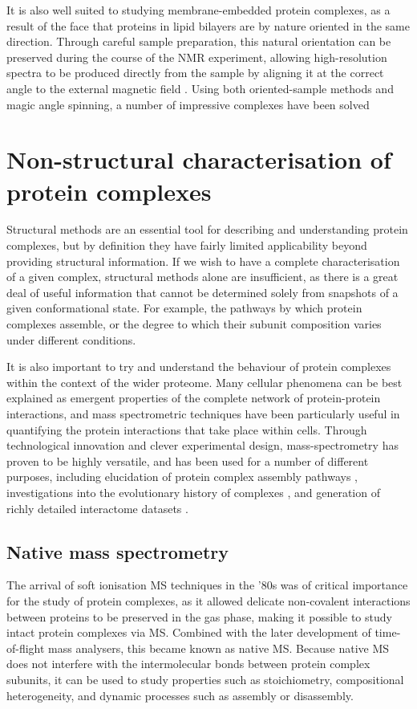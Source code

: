 \documentclass[a4paper,11pt,twoside,openright]{scrbook}
\begin{document}
It is also well suited to studying membrane-embedded protein complexes, as a result of the face that proteins in lipid bilayers are by nature oriented in the same direction. Through careful sample preparation, this natural orientation can be preserved during the course of the NMR experiment, allowing high-resolution spectra to be produced directly from the sample by aligning it at the correct angle to the external magnetic field \cite{Hansen2015}. Using both oriented-sample methods and magic angle spinning, a number of impressive complexes have been solved \cite{Loquet2012,Kaplan2015,Huang2017}

\section{Non-structural characterisation of protein complexes}
Structural methods are an essential tool for describing and understanding protein complexes, but by definition they have fairly limited applicability beyond providing structural information. If we wish to have a complete characterisation of a given complex, structural methods alone are insufficient, as there is a great deal of useful information that cannot be determined solely from snapshots of a given conformational state. For example, the pathways by which protein complexes assemble, or the degree to which their subunit composition varies under different conditions.

It is also important to try and understand the behaviour of protein complexes within the context of the wider proteome. Many cellular phenomena can be best explained as emergent properties of the complete network of protein-protein interactions, and mass spectrometric techniques have been particularly useful in quantifying the protein interactions that take place within cells. Through technological innovation and clever experimental design, mass-spectrometry has proven to be highly versatile, and has been used for a number of different purposes, including elucidation of protein complex assembly pathways \cite{Levy2008,Marsh2013}, investigations into the evolutionary history of complexes \cite{Wan2015}, and generation of richly detailed interactome datasets \cite{Hein2015}.

\subsection{Native mass spectrometry}
The arrival of soft ionisation MS techniques in the '80s was of critical importance for the study of protein complexes, as it allowed delicate non-covalent interactions between proteins to be preserved in the gas phase, making it possible to study intact protein complexes via MS. Combined with the later development of time-of-flight mass analysers, this became known as native MS. Because native MS does not interfere with the intermolecular bonds between protein complex subunits, it can be used to study properties such as stoichiometry, compositional heterogeneity, and dynamic processes such as assembly or disassembly.
\end{document}
